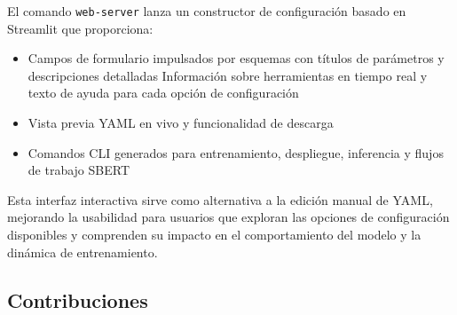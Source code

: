 \documentclass[11pt,a4paper]{article}
\begin{document}
El comando \texttt{web-server} lanza un constructor de configuración basado en Streamlit que proporciona:
\begin{itemize}[leftmargin=*]
    \item Campos de formulario impulsados por esquemas con títulos de parámetros y descripciones detalladas
    \uta Información sobre herramientas en tiempo real y texto de ayuda para cada opción de configuración
    \item Vista previa YAML en vivo y funcionalidad de descarga
    \item Comandos CLI generados para entrenamiento, despliegue, inferencia y flujos de trabajo SBERT
\end{itemize}

Esta interfaz interactiva sirve como alternativa a la edición manual de YAML, mejorando la usabilidad para usuarios que exploran las opciones de configuración disponibles y comprenden su impacto en el comportamiento del modelo y la dinámica de entrenamiento.

\subsection{Contribuciones}
\end{document}

